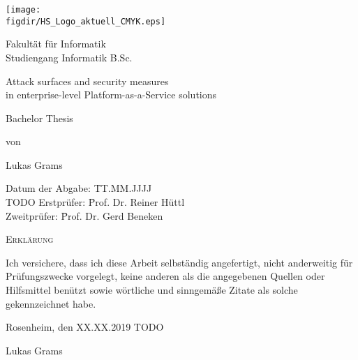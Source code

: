 \begin{titlepage}

\sffamily

\raggedleft

\vspace*{-2cm}

\texttt{[image: \\figdir/HS\_Logo\_aktuell\_CMYK.eps]}

\vfill

\centering
\Huge
Fakultät für Informatik  \vspace{0.5cm}\\
\Large
Studiengang Informatik B.Sc.

\Huge
Attack surfaces and security measures \\
in enterprise-level Platform-as-a-Service solutions

\vspace{2cm}

\Large
Bachelor Thesis


\vspace{1.5cm}

\Large
von

\vspace{0.5cm}

\LARGE
Lukas Grams

\vspace{1cm}

\flushleft
 \Large
\vspace*{\fill}

\begin{tabbing}
Datum der Abgabe: \= TT.MM.JJJJ \\ TODO
Erstprüfer: \= Prof. Dr. Reiner Hüttl \\
Zweitprüfer: \= Prof. Dr. Gerd Beneken \\
\end{tabbing}

\end{titlepage}


\cleardoubleemptypage

{
\large
\thispagestyle{empty}
\vspace*{\fill}

\noindent
\textsc{Erklärung}

\medskip

\noindent
Ich versichere, dass ich diese Arbeit selbständig
angefertigt, nicht anderweitig für Prüfungszwecke
vorgelegt, keine anderen als die angegebenen Quellen
oder Hilfsmittel benützt sowie wörtliche und
sinngemäße Zitate als solche gekennzeichnet habe.

\bigskip

\noindent
Rosenheim, den XX.XX.2019 TODO

\vspace*{2cm}

\noindent
Lukas Grams
}